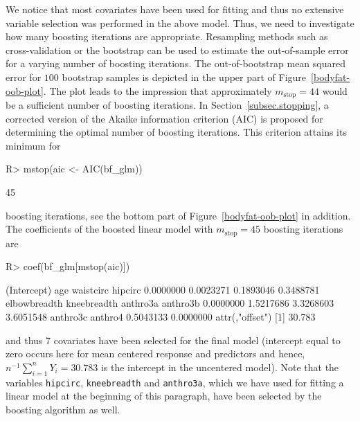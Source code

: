 \documentclass{article}
\newcommand{\Robject}[1]{\texttt{#1}}
\newenvironment{Schunk}{}{}
\begin{document}
We notice that most covariates have been used for fitting
and thus no extensive variable selection was performed in the above model. 
Thus, we need to investigate how many boosting iterations are appropriate. Resampling
methods such as cross-validation or the bootstrap can be used to estimate
the out-of-sample error for a varying number of boosting iterations. The
out-of-bootstrap mean  
squared error for $100$ bootstrap samples is depicted in the upper part of 
Figure~\ref{bodyfat-oob-plot}. The plot
leads to the impression that approximately $m_\text{stop} = 44$ would be a sufficient
number of boosting iterations.
In Section~\ref{subsec.stopping}, a corrected version of the Akaike
information criterion (AIC) is proposed for determining the optimal number
of boosting iterations. This criterion attains its 
minimum for
\begin{Schunk}
\begin{Sinput}
R> mstop(aic <- AIC(bf_glm))
\end{Sinput}
\begin{Soutput}
[1] 45
\end{Soutput}
\end{Schunk}
boosting iterations, see the bottom part of
Figure~\ref{bodyfat-oob-plot} in addition.
The coef\-ficients of the boosted linear model with 
$m_\text{stop} = 45$ 
boosting iterations are
\begin{Schunk}
\begin{Sinput}
R> coef(bf_glm[mstop(aic)])
\end{Sinput}
\begin{Soutput}
 (Intercept)          age    waistcirc      hipcirc 
   0.0000000    0.0023271    0.1893046    0.3488781 
elbowbreadth  kneebreadth     anthro3a     anthro3b 
   0.0000000    1.5217686    3.3268603    3.6051548 
    anthro3c      anthro4 
   0.5043133    0.0000000 
attr(,"offset")
[1] 30.783
\end{Soutput}
\end{Schunk}
and thus 7 covariates have been selected for the final
model (intercept equal to zero occurs here for mean centered response and
predictors and hence, 
$n^{-1} \sum_{i=1}^n Y_i = 30.783$
is the intercept in the uncentered model). Note that    
the variables \Robject{hipcirc}, \Robject{kneebreadth} and
\Robject{anthro3a}, which 
we have used for fitting a linear model at the beginning of this
paragraph, have been selected by the boosting algorithm as well.  
\end{document}
